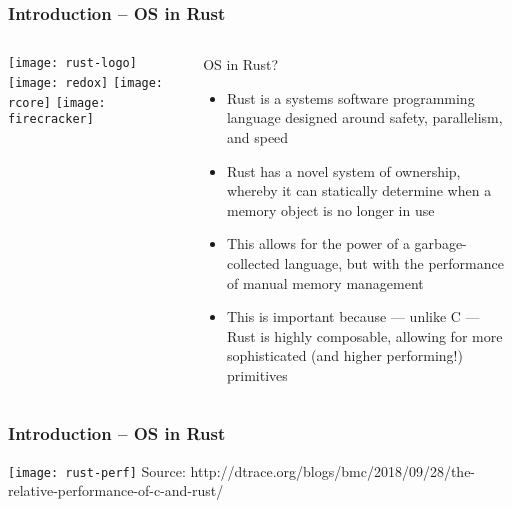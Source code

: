 \begin{frame}[plain]
	\frametitle{Introduction -- OS in Rust}
	
	
	
	\begin{columns}
		
		\begin{column}{.2\textwidth}
			
			\texttt{[image: rust-logo]}
			\texttt{[image: redox]}
			\texttt{[image: rcore]}
			\texttt{[image: firecracker]}
		\end{column}
		
		\begin{column}{.8\textwidth}
			
			OS in Rust?
			
			\begin{itemize}
				
				\item  Rust is a systems software programming language designed
				around safety, parallelism, and speed
				
				\item Rust has a novel system of ownership, whereby it can statically
				determine when a memory object is no longer in use
				
				\item This allows for the power of a garbage-collected language, but
				with the performance of manual memory management
				
				\item  This is important because — unlike C — Rust is highly
				composable, allowing for more sophisticated (and higher
				performing!) primitives
				
				
			\end{itemize}
			
		\end{column}
		
		
	\end{columns}
	
	
\end{frame}

\begin{frame}[plain]	
	\frametitle{Introduction -- OS in Rust}
	\centering
	\texttt{[image: rust-perf]}
	 \tiny Source: http://dtrace.org/blogs/bmc/2018/09/28/the-relative-performance-of-c-and-rust/
	 
\end{frame}



